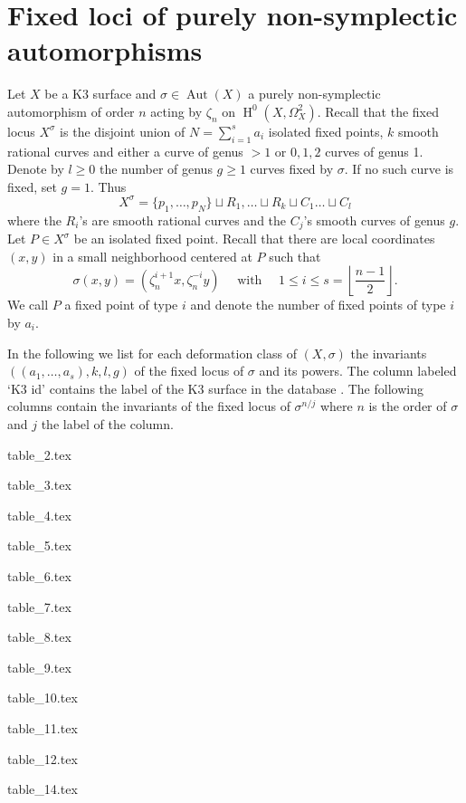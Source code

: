 \documentclass[a4paper]{amsart}
\makeatletter
\newcommand*\ExpandableInput[1]{\@@input#1 }
\theoremstyle{definition}
\theoremstyle{plain}
\DeclareMathOperator{\Aut}{Aut}
\DeclareMathOperator{\HH}{H}
\makeatother
\begin{document}
\section{Fixed loci of purely non-symplectic automorphisms}
\label{appendixB}
 Let $X$ be a K3 surface and $\sigma \in \Aut(X)$ a purely non-symplectic automorphism of order $n$ acting by $\zeta_n$ on $\HH^0(X,\Omega_X^2)$.
 Recall that the fixed locus $X^\sigma$ is the disjoint union of $N = \sum_{i=1}^s a_i$ isolated fixed points, $k$ smooth rational curves and either a curve of genus $>1$
or $0, 1, 2$ curves of genus 1.
Denote by $l\geq 0$ the number of genus $g \geq 1$ curves fixed by $\sigma$. If no such curve is fixed, set $g=1$. Thus
\[X^\sigma = \{p_1, \dots, p_N\} \sqcup R_1 , \dots \sqcup R_k \sqcup C_1 \dots \sqcup C_l\]
where the $R_i$'s are smooth rational curves and the $C_j$'s smooth curves of genus $g$.
Let $P \in X^\sigma$ be an isolated fixed point. Recall that there are local coordinates $(x,y)$ in a small neighborhood centered at $P$ such that
\[\sigma(x,y) = (\zeta_n^{i+1}x,\zeta_n^{-i} y)\quad \mbox{  with } \quad 1 \leq i \leq s = \left\lfloor\frac{n-1}{2}\right\rfloor.\]
We call $P$ a fixed point of type $i$ and denote the number of fixed points of type $i$ by $a_i$.

In the following we list for each deformation class of $(X, \sigma)$ the invariants $((a_1, \dots, a_s), k, l, g)$ of the fixed locus of $\sigma$ and its powers.
The column labeled `K3 id' contains the label of the K3 surface in the database \cite{K3Groups}.
The following columns contain the invariants of the fixed locus of $\sigma^{n/j}$ where $n$ is the order of $\sigma$ and $j$ the label of the column.

\ExpandableInput{table_2.tex}

\ExpandableInput{table_3.tex}

\ExpandableInput{table_4.tex}

\ExpandableInput{table_5.tex}

\ExpandableInput{table_6.tex}

\ExpandableInput{table_7.tex}

\ExpandableInput{table_8.tex}

\ExpandableInput{table_9.tex}

\ExpandableInput{table_10.tex}

\ExpandableInput{table_11.tex}

\ExpandableInput{table_12.tex}

%

\ExpandableInput{table_14.tex}
\end{document}
